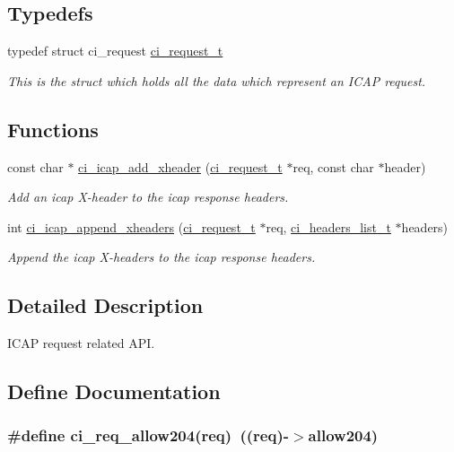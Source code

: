 \subsection*{Typedefs}
\begin{DoxyCompactItemize}
\item 
typedef struct ci\_\-request \hyperlink{group__REQUEST_ga27da5c4ae491f527ce36901c2e78ea04}{ci\_\-request\_\-t}
\begin{DoxyCompactList}\small\item\em This is the struct which holds all the data which represent an ICAP request. \item\end{DoxyCompactList}\end{DoxyCompactItemize}
\subsection*{Functions}
\begin{DoxyCompactItemize}
\item 
const char $\ast$ \hyperlink{group__REQUEST_ga94393b6b41ccfb7b65c42e2eaff89791}{ci\_\-icap\_\-add\_\-xheader} (\hyperlink{group__REQUEST_ga27da5c4ae491f527ce36901c2e78ea04}{ci\_\-request\_\-t} $\ast$req, const char $\ast$header)
\begin{DoxyCompactList}\small\item\em Add an icap X-\/header to the icap response headers. \item\end{DoxyCompactList}\item 
int \hyperlink{group__REQUEST_gab3bc00aa780fa6899d5046f964a31f39}{ci\_\-icap\_\-append\_\-xheaders} (\hyperlink{group__REQUEST_ga27da5c4ae491f527ce36901c2e78ea04}{ci\_\-request\_\-t} $\ast$req, \hyperlink{group__HEADERS_gaaa203ac92dd0242ab66f4237548d7260}{ci\_\-headers\_\-list\_\-t} $\ast$headers)
\begin{DoxyCompactList}\small\item\em Append the icap X-\/headers to the icap response headers. \item\end{DoxyCompactList}\end{DoxyCompactItemize}


\subsection{Detailed Description}
ICAP request related API. 

\subsection{Define Documentation}
\hypertarget{group__REQUEST_gafbf6996e069feff290985ed0c6d9da41}{
\subsubsection[{ci\_\-req\_\-allow204}]{\setlength{\rightskip}{0pt plus 5cm}\#define ci\_\-req\_\-allow204(req)~((req)-\/$>$allow204)}}
\label{group__REQUEST_gafbf6996e069feff290985ed0c6d9da41}

